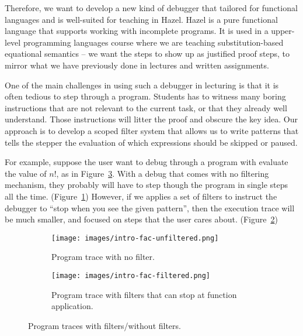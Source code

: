 
Therefore, we want to develop a new kind of debugger that tailored for
functional languages and is well-suited for teaching in Hazel. Hazel is a pure
functional language that supports working with incomplete programs. It is used
in a upper-level programming languages course where we are teaching
substitution-based equational semantics -- we want the steps to show up as
justified proof steps, to mirror what we have previously done in lectures and
written assignments.


One of the main challenges in using such a debugger in lecturing is
that it is often tedious to step through a program. Students has to
witness many boring instructions that are not relevant to the current
task, or that they already well understand. Those instructions will
litter the proof and obscure the key idea. Our approach is to develop
a scoped filter system that allows us to write patterns that tells the
stepper the evaluation of which expressions should be skipped or paused.

For example, suppose the user want to debug through
a program with evaluate the value of \(n!\), as in
Figure~\ref{fig:intro-fac}. With a debug that comes with no filtering
mechanism, they probably will have to step though the program in
single steps all the time. (Figure~\ref{fig:intro-fac-unfiltered})
However, if we applies a set of filters to instruct the debugger to
``stop when you see the given pattern'', then the execution trace will
be much smaller, and focused on steps that the user cares
about. (Figure~\ref{fig:intro-fac-filtered})

\begin{figure}[h]
  \begin{center}
    \begin{subfigure}[t]{0.48\textwidth}
      \centering
      \texttt{[image: images/intro-fac-unfiltered.png]}
      \caption{Program trace with no filter.}
      \label{fig:intro-fac-unfiltered}
    \end{subfigure}
    \quad
    \begin{subfigure}[t]{0.48\textwidth}
      \centering
      \texttt{[image: images/intro-fac-filtered.png]}
      \caption{Program trace with filters that can stop at function application.}
      \label{fig:intro-fac-filtered}
    \end{subfigure}
  \end{center}
  \caption{Program traces with filters/without filters.}
  \label{fig:intro-fac}
\end{figure}

